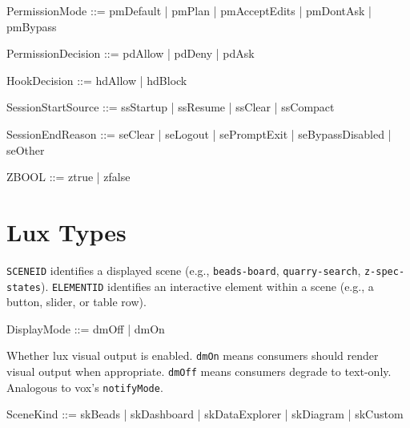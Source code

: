 \documentclass[a4paper,10pt,fleqn]{article}
\begin{document}
\begin{zed}
  PermissionMode ::= pmDefault | pmPlan | pmAcceptEdits | pmDontAsk | pmBypass
\end{zed}

\begin{zed}
  PermissionDecision ::= pdAllow | pdDeny | pdAsk
\end{zed}

\begin{zed}
  HookDecision ::= hdAllow | hdBlock
\end{zed}

\begin{zed}
  SessionStartSource ::= ssStartup | ssResume | ssClear | ssCompact
\end{zed}

\begin{zed}
  SessionEndReason ::= seClear | seLogout | sePromptExit | seBypassDisabled | seOther
\end{zed}

\begin{zed}
  ZBOOL ::= ztrue | zfalse
\end{zed}

\section{Lux Types}

\begin{zed}
\end{zed}

\texttt{SCENEID} identifies a displayed scene (e.g.,
\texttt{beads-board}, \texttt{quarry-search}, \texttt{z-spec-states}).
\texttt{ELEMENTID} identifies an interactive element within a scene
(e.g., a button, slider, or table row).

\begin{zed}
  DisplayMode ::= dmOff | dmOn
\end{zed}

Whether lux visual output is enabled. \texttt{dmOn} means consumers
should render visual output when appropriate. \texttt{dmOff} means
consumers degrade to text-only. Analogous to vox's
\texttt{notifyMode}.

\begin{zed}
  SceneKind ::= skBeads | skDashboard | skDataExplorer | skDiagram | skCustom
\end{zed}
\end{document}
